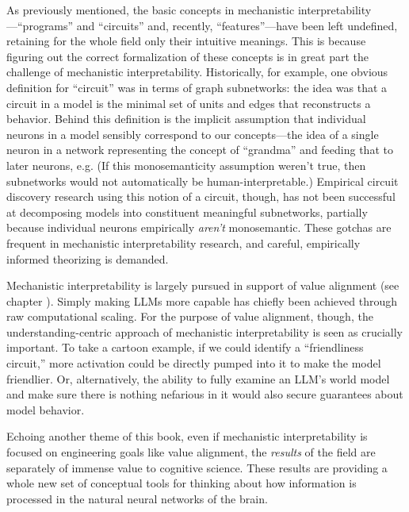 As previously mentioned, the basic concepts in mechanistic
interpretability---``programs'' and ``circuits'' and, recently,
``features''---have been left undefined, retaining for the whole field only
their intuitive meanings. This is because figuring out the correct
formalization of these concepts is in great part the challenge of mechanistic
interpretability. Historically, for example, one obvious definition for
``circuit'' was in terms of graph subnetworks: the idea was that a circuit in a
model is the minimal set of units and edges that reconstructs a behavior. 
Behind this definition is the implicit assumption that
individual neurons in a model sensibly correspond to our concepts---the idea of
a single neuron in a network representing the concept of ``grandma'' and
feeding that to later neurons, e.g. (If this monosemanticity assumption weren't
true, then subnetworks would not automatically be human-interpretable.)
Empirical circuit discovery research using this notion of a circuit, though,
has not been successful at decomposing models into constituent
meaningful subnetworks, partially because individual neurons empirically
\emph{aren't} monosemantic. These gotchas are frequent in mechanistic
interpretability research, and careful, empirically informed theorizing is
demanded.

Mechanistic interpretability is largely pursued in support of value alignment
(see chapter ). Simply making LLMs more capable has
chiefly been achieved through raw computational scaling. For the purpose of
value alignment, though, the understanding-centric approach of mechanistic
interpretability is seen as crucially important. To take a cartoon example, if
we could identify a ``friendliness circuit,'' more activation could be directly
pumped into it to make the model friendlier. Or, alternatively, the ability to
fully examine an LLM's world model and make sure there is nothing nefarious in
it would also secure guarantees about model behavior.

Echoing another theme of this book, even if mechanistic
interpretability is focused on engineering
goals like value alignment, the \emph{results} of the field are separately of
immense value to cognitive science. These results are providing a whole new set
of conceptual tools for thinking about how information is processed in the
natural neural networks of the brain.

